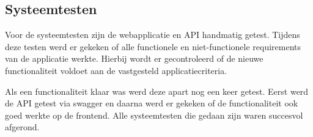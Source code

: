 \subsection{Systeemtesten}
Voor de systeemtesten zijn de webapplicatie en API handmatig getest.
Tijdens deze testen werd er gekeken of alle functionele en niet-functionele requirements van de applicatie werkte.
Hierbij wordt er gecontroleerd of de nieuwe functionaliteit voldoet aan de vastgesteld applicatiecriteria.

\whitespace
Als een functionaliteit klaar was werd deze apart nog een keer getest.
Eerst werd de API getest via swagger en daarna werd er gekeken of de functionaliteit ook goed werkte op de frontend.
Alle systeemtesten die gedaan zijn waren succesvol afgerond.
